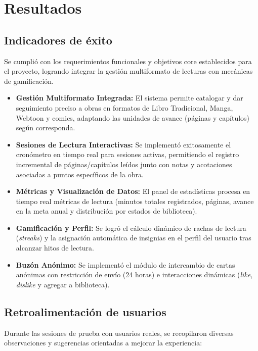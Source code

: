 \documentclass[12pt, atypical, journal]{article}
\begin{document}
\section{Resultados}

\subsection{Indicadores de éxito}
Se cumplió con los requerimientos funcionales y objetivos core establecidos para el proyecto, logrando integrar la gestión multiformato de lecturas con mecánicas de gamificación.

\begin{itemize}
	\item \textbf{Gestión Multiformato Integrada:} El sistema permite catalogar y dar seguimiento preciso a obras en formatos de Libro Tradicional, Manga, Webtoon y comics, adaptando las unidades de avance (páginas y capítulos) según corresponda.
	
	\item \textbf{Sesiones de Lectura Interactivas:} Se implementó exitosamente el cronómetro en tiempo real para sesiones activas, permitiendo el registro incremental de páginas/capítulos leídos junto con notas y acotaciones asociadas a puntos específicos de la obra.
	
	\item \textbf{Métricas y Visualización de Datos:} El panel de estadísticas procesa en tiempo real métricas de lectura (minutos totales registrados, páginas, avance en la meta anual y distribución por estados de biblioteca).
	
	\item \textbf{Gamificación y Perfil:} Se logró el cálculo dinámico de rachas de lectura (\textit{streaks}) y la asignación automática de insignias en el perfil del usuario tras alcanzar hitos de lectura.
	
	\item \textbf{Buzón Anónimo:} Se implementó el módulo de intercambio de cartas anónimas con restricción de envío (24 horas) e interacciones dinámicas (\textit{like}, \textit{dislike} y agregar a biblioteca).
\end{itemize}

\subsection{Retroalimentación de usuarios}
Durante las sesiones de prueba con usuarios reales, se recopilaron diversas observaciones y sugerencias orientadas a mejorar la experiencia:
\end{document}
